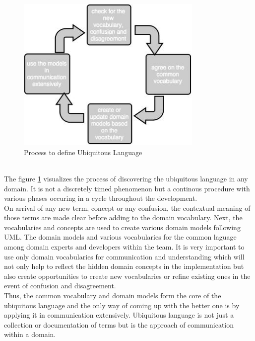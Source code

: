 \begin{figure}[H]
\begin{center}
\includegraphics[width=0.8\textwidth]{figures/domain-driven-design-one}
\caption{Process to define Ubiquitous Language \cite{Evans:2003aa}}
\label{fig:domain_driven_design/ubiquitous_language_process}
\end{center}
\end{figure}
\\
The figure \ref{fig:domain_driven_design/ubiquitous_language_process} visualizes the process of discovering the ubiquitous language in any domain. It is not a discretely timed phenomenon but a continous procedure with various phases occuring in a cycle throughout the development.
\\
On arrival of any new term, concept or any confusion, the contextual meaning of those terms are made clear before adding to the domain vocabulary. Next, the vocabularies and concepts are used to create various domain models following \acrshort{UML}. The domain models and various vocabularies for the common laguage among domain experts and developers within the team. It is very important to use only domain vocabularies for communication and understanding which will not only help to reflect the hidden domain concepts in the implementation but also create opportunities to create new vocabularies or refine existing ones in the event of confusion and disagreement.\cite{Evans:2003aa}
\\
Thus, the common vocabulary and domain models form the core of the ubiquitous language and the only way of coming up with the better one is by applying it in communication extensively. Ubiquitous language is not just a collection or documentation of terms but is the approach of communication within a domain.
\\
